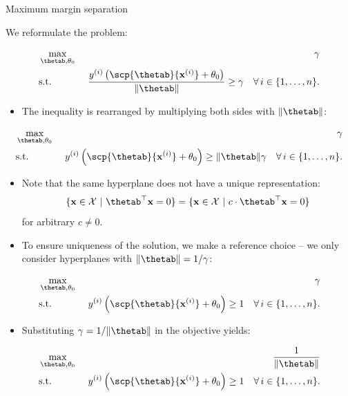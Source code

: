 \documentclass[11pt,compress,t,notes=noshow, xcolor=table]{beamer}
\begin{document}
\begin{vbframe}{Maximum margin separation}

We reformulate the problem:

\begin{eqnarray*}
   & \max \limits_{\thetab, \theta_0} & \gamma \\
   & \text{s.t.} & \,\, \frac{\yi \left( \scp{\thetab}{\xi} + \theta_0 \right)}{\|\thetab\|} \geq \gamma \quad \forall\, i \in \nset.
\end{eqnarray*}

\begin{itemize}
  \item The inequality is rearranged by multiplying both sides with $\|\thetab\|$:
\end{itemize}

\begin{eqnarray*}
   & \max \limits_{\thetab, \theta_0} & \gamma \\
   & \text{s.t.} & \,\,\yi  \left( \scp{\thetab}{\xi} + \theta_0 \right) \geq \|\thetab\| \gamma \quad \forall\, i \in \nset.
\end{eqnarray*}

\framebreak

  \begin{itemize}
    \item Note that the same hyperplane does not have a unique representation:
    $$
      \{\xv \in \Xspace ~|~ \thetab^\top \xv = 0\} = \{\xv \in \Xspace ~|~ c \cdot \thetab^\top \xv = 0\}
    $$
    for arbitrary $c \ne 0$.
    \item To ensure uniqueness of the solution, we make a reference choice -- we only consider hyperplanes with $\|\thetab\| = 1 / \gamma$:
  \end{itemize}

  \begin{eqnarray*}
     & \max \limits_{\thetab, \theta_0} & \gamma \\
     & \text{s.t.} & \,\,\yi  \left( \scp{\thetab}{\xi} + \theta_0 \right) \geq 1 \quad \forall\, i \in \nset.
  \end{eqnarray*}

\framebreak

  \begin{itemize}
    \item Substituting $\gamma = 1 / \|\thetab\|$ in the objective yields:
  \end{itemize}

  \begin{eqnarray*}
     & \max \limits_{\thetab, \theta_0} & \frac{1}{\|\thetab\|} \\
     & \text{s.t.} & \,\,\yi  \left( \scp{\thetab}{\xi} + \theta_0 \right) \geq 1 \quad \forall\, i \in \nset.
  \end{eqnarray*}


\end{vbframe}
\end{document}
